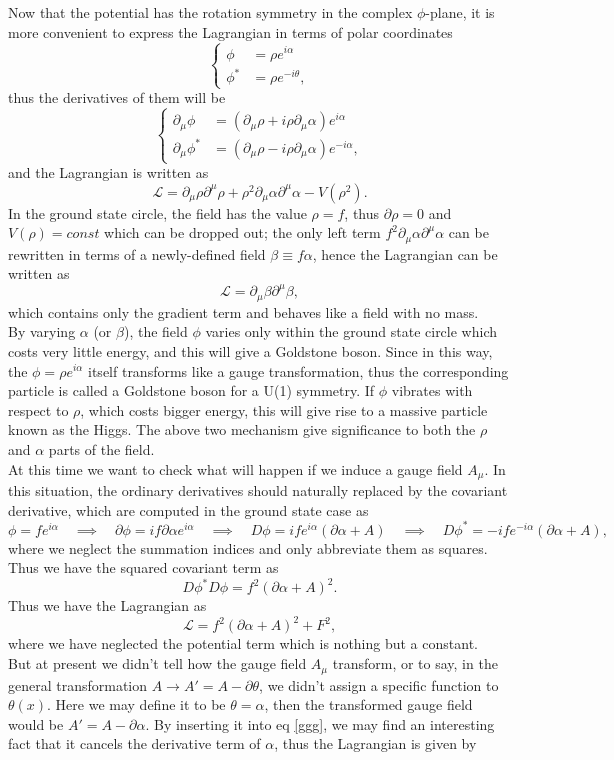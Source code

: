\documentclass{article}
\newcommand{\be}{\begin{equation}}
\newcommand{\ee}{\end{equation}}
\newcommand{\p}{\partial}
\renewcommand{\1}{\left}
\renewcommand{\2}{\right}
\newcommand{\ma}{\mathcal}
\newcommand{\rar}{\quad\implies\quad}
\newcommand{\m}{\mu}
\newcommand{\al}{\alpha}
\newcommand{\bet}{\beta}
\renewcommand{\th}{\theta}
\begin{document}
Now that the potential has the rotation symmetry in the complex $\phi$-plane, it is more convenient to express the Lagrangian in terms of polar coordinates
\be\1\{\begin{split}
\phi&=\rho e^{i\al} \\
\phi^*&=\rho e^{-i\th},
\end{split}\2.\ee
thus the derivatives of them will be
\be\1\{\begin{split}
\p_\m\phi&=\1(\p_\m \rho+i\rho\p_\m\al\2)e^{i\al} \\
\p_\m\phi^*&=\1(\p_\m \rho-i\rho\p_\m\al\2)e^{-i\al},
\end{split}\2.\ee
and the Lagrangian is written as
\be
\ma L=\p_\m\rho\p^\m\rho+\rho^2\p_\m\al\p^\m\al-V(\rho^2).
\ee
In the ground state circle, the field has the value $\rho=f$, thus $\p\rho=0$ and $V(\rho)=const$ which can be dropped out; the only left term $f^2\p_\m\al\p^\m\al$ can be rewritten in terms of a newly-defined field $\bet\equiv f\al$, hence the Lagrangian can be written as
\be \ma L=\p_\m\bet\p^\m\bet, \ee
which contains only the gradient term and behaves like a field with no mass.\\
By varying $\al$ (or $\bet$), the field $\phi$ varies only within the ground state circle which costs very little energy, and this will give a Goldstone boson. Since in this way, the $\phi=\rho e^{i\al}$ itself transforms like a gauge transformation, thus the corresponding particle is called a Goldstone boson for a U(1) symmetry. If $\phi$ vibrates with respect to $\rho$, which costs bigger energy, this will give rise to a massive particle known as the Higgs. The above two mechanism give significance to  both the $\rho$ and $\al$ parts of the field.\\
At this time we want to check what will happen if we induce a gauge field $A_\m$. In this situation, the ordinary derivatives should naturally replaced by the covariant derivative, which are computed in the ground state case as
\be
\phi=fe^{i\al} \rar \p\phi=if\p\al e^{i\al} \rar D\phi=ife^{i\al}(\p\al+A) \rar D\phi^*=-ife^{-i\al}(\p\al+A),
\ee
where we neglect the summation indices and only abbreviate them as squares. Thus we have the squared covariant term as
\be D\phi^*D\phi=f^2 (\p\al+A)^2. \ee
Thus we have the Lagrangian as 
\be\label{ggg}
\ma L=f^2 (\p\al+A)^2+F^2,
\ee
where we have neglected the potential term which is nothing but a constant.\\
But at present we didn't tell how the gauge field $A_\m$ transform, or to say, in the general transformation $A\rightarrow A'=A-\p\th$, we didn't assign a specific function to $\th(x)$. Here we may define it to be $\th=\al$, then the transformed gauge field would be $A'=A-\p\al$. By inserting it into eq \eqref{ggg}, we may find an interesting fact that it cancels the derivative term of $\al$, thus the Lagrangian is given by
\end{document}

